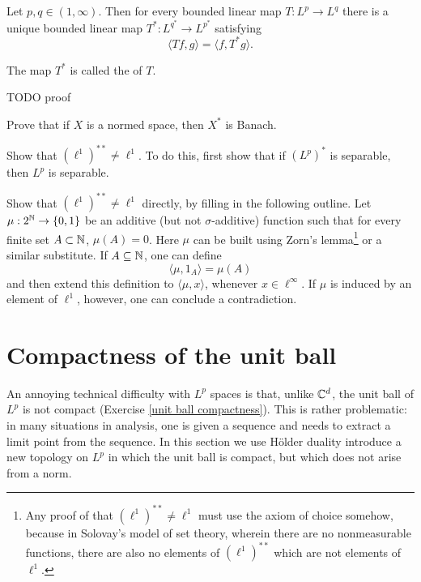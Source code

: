 \begin{theorem}
Let $p, q \in (1, \infty)$. Then for every bounded linear map $T: L^p \to L^q$ there is a unique bounded linear map $T^*: L^{q^*} \to L^{p^*}$ satisfying
$$\langle Tf, g\rangle = \langle f, T^*g\rangle.$$
\end{theorem}
\begin{definition}
The map $T^*$ is called the  of $T$.
\end{definition}
TODO proof





\begin{exercise}
\label{dual space is banach}
Prove that if $X$ is a normed space, then $X^*$ is Banach.
\end{exercise}

\begin{exercise}
Show that $(\ell^1)^{**} \neq \ell^1$.
To do this, first show that if $(L^p)^*$ is separable, then $L^p$ is separable.
\end{exercise}

\begin{exercise}
Show that $(\ell^1)^{**} \neq \ell^1$ directly, by filling in the following outline.
Let $\mu: 2^{\mathbb{N}} \to \{0, 1\}$ be an additive (but not $\sigma$-additive) function such that for every finite set $A \subset \mathbb{N}$, $\mu(A) = 0$.
Here $\mu$ can be built using Zorn's lemma\footnote{Any proof of that $(\ell^1)^{**} \neq \ell^1$ must use the axiom of choice somehow, because in Solovay's model of set theory, wherein there are no nonmeasurable functions, there are also no elements of $(\ell^1)^{**}$ which are not elements of $\ell^1$.} or a similar substitute.
If $A \subseteq \mathbb{N}$, one can define
$$\langle \mu, 1_A\rangle = \mu(A)$$
and then extend this definition to $\langle \mu, x\rangle$, whenever $x \in \ell^\infty$.
If $\mu$ is induced by an element of $\ell^1$, however, one can conclude a contradiction.
\end{exercise}

\section{Compactness of the unit ball}
An annoying technical difficulty with $L^p$ spaces is that, unlike $\mathbb{C}^d$, the unit ball of $L^p$ is not compact (Exercise \ref{unit ball compactness}).
This is rather problematic: in many situations in analysis, one is given a sequence and needs to extract a limit point from the sequence.
In this section we use H\"older duality introduce a new topology on $L^p$ in which the unit ball is compact, but which does not arise from a norm.

